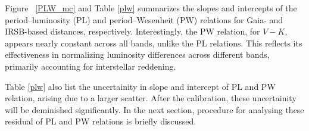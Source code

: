 



Figure~ \ref{PLW_mc} and Table \ref{plw} summarizes the slopes and intercepts of the period--luminosity (PL) and period--Wesenheit (PW) relations for Gaia- and IRSB-based distances, respectively. Interestingly, the PW relation, for $V-K$, appears nearly constant across all bands, unlike the PL relations. This reflects its effectiveness in normalizing luminosity differences across different bands, primarily accounting for interstellar reddening.

Table \ref{plw} also list the uncertainity in slope and intercept of PL and PW relation, arising due to a larger scatter. After the calibration, these uncertainity will be deminished significantly. In the next section, procedure for analysing these residual of PL and PW relations is briefly discussed.


